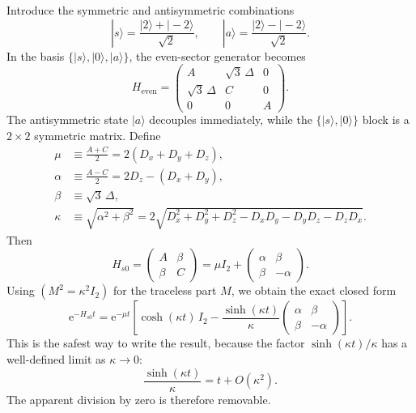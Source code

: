 \documentclass[11pt]{article}
\newcommand{\e}{\mathrm{e}}
\begin{document}
Introduce the symmetric and antisymmetric combinations
\begin{equation}
|s\rangle=\frac{|2\rangle+|-2\rangle}{\sqrt{2}},
\qquad
|a\rangle=\frac{|2\rangle-|-2\rangle}{\sqrt{2}}.
\end{equation}
In the basis $\{|s\rangle,|0\rangle,|a\rangle\}$, the even-sector generator becomes
\begin{equation}
H_{\mathrm{even}}=
\begin{pmatrix}
A & \sqrt{3}\,\Delta & 0\\
\sqrt{3}\,\Delta & C & 0\\
0 & 0 & A
\end{pmatrix}.
\end{equation}
The antisymmetric state $|a\rangle$ decouples immediately, while the $\{|s\rangle,|0\rangle\}$ block is a $2\times2$ symmetric matrix.  Define
\begin{align}
\mu &\equiv \frac{A+C}{2}=2(D_x+D_y+D_z),\\
\alpha &\equiv \frac{A-C}{2}=2D_z-(D_x+D_y),\\
\beta &\equiv \sqrt{3}\,\Delta,\\
\kappa &\equiv \sqrt{\alpha^2+\beta^2}
=2\sqrt{D_x^2+D_y^2+D_z^2-D_xD_y-D_yD_z-D_zD_x}.
\end{align}
Then
\begin{equation}
H_{s0}=
\begin{pmatrix}
A & \beta\\
\beta & C
\end{pmatrix}
=\mu I_2+
\begin{pmatrix}
\alpha & \beta\\
\beta & -\alpha
\end{pmatrix}.
\end{equation}
Using $(M^2=\kappa^2 I_2)$ for the traceless part $M$, we obtain the exact closed form
\begin{equation}
\e^{-H_{s0}t}
=
\e^{-\mu t}
\left[
\cosh(\kappa t)\,I_2
-
\frac{\sinh(\kappa t)}{\kappa}
\begin{pmatrix}
\alpha & \beta\\
\beta & -\alpha
\end{pmatrix}
\right].
\label{eq:hs0exp}
\end{equation}
This is the safest way to write the result, because the factor $\sinh(\kappa t)/\kappa$ has a well-defined limit as $\kappa\to 0$:
\begin{equation}
\frac{\sinh(\kappa t)}{\kappa}=t+O(\kappa^2).
\end{equation}
The apparent division by zero is therefore removable.
\end{document}
